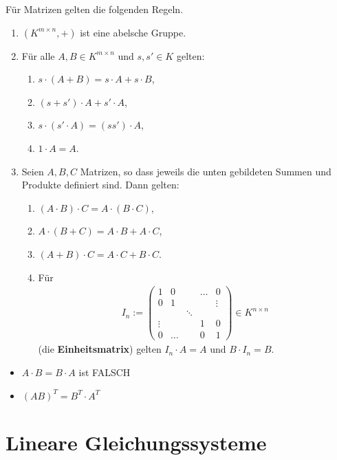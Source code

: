 \documentclass{scrartcl}
\begin{document}
\begin{Satz} 
Für Matrizen gelten die folgenden Regeln.
\begin{enumerate}[label={(\alph*)}]
\item $(K^{m \times n}, +)$ ist eine abelsche Gruppe.
\item Für alle $A,B \in K^{m \times n}$ und $s,s' \in K$ gelten:
    \begin{enumerate}[label={(\arabic*)}]
    \item $s \cdot (A + B) = s \cdot A + s \cdot B$,
    \item $(s + s') \cdot A + s' \cdot A$,
    \item $s \cdot (s' \cdot A) = (ss') \cdot A$,
    \item $1 \cdot A = A$.
    \end{enumerate}
\item Seien $A,B,C$ Matrizen, so dass jeweils die unten gebildeten Summen und Produkte definiert sind. Dann gelten:
    \begin{enumerate}[label={(\arabic*)}]
    \item $(A \cdot B) \cdot C = A \cdot (B \cdot C)$,
    \item $A \cdot (B + C) = A \cdot B + A \cdot C$,
    \item $(A + B) \cdot C = A \cdot C + B \cdot C$.
    \item Für
        \begin{align*}
        I_n := \begin{pmatrix}
            1 & 0 & & \dots & 0 \\
            0 & 1 & & & \vdots \\
            & & \ddots & & \\
            \vdots & & & 1 & 0 \\
            0 & \dots & & 0 & 1
        \end{pmatrix} \in K^{n \times n}
        \end{align*}
        (die \textbf{Einheitsmatrix}) gelten $I_n \cdot A = A$ und $B \cdot I_n = B$.
    \end{enumerate}
\end{enumerate}
\begin{itemize}
\item $A \cdot B = B \cdot A $ ist FALSCH
\item $(AB)^T = B^T \cdot A^T$
\end{itemize}
\end{Satz}

\newpage
\section{Lineare Gleichungssysteme}
\label{Lineares Gleichungssystem}
\end{document}
